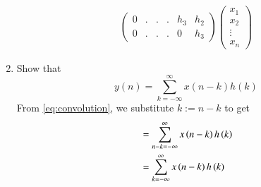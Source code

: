 \documentclass[journal,12pt,twocolumn]{IEEEtran}
\renewcommand\thesection{\arabic{section}}
\begin{document}
\begin{enumerate}[label=\thesection.\arabic*]
\begin{align}
\begin{pmatrix}
		0 & . & . & . & h_3 & h_2 \\
		0 & . & . & . & 0 & h_3
	\end{pmatrix}
	\begin{pmatrix}
		x_1 \\ x_2 \\ \vdots \\ x_n
	\end{pmatrix}
\end{align}
\item Show that
\begin{equation}
	y(n) =  \sum_{k=-\infty}^{\infty}x(n-k)h(k)
\end{equation}
\solution 
From \eqref{eq:convolution}, we substitute $k := n - k$ to get
\begin{align}
	&= \sum_{n - k=-\infty}^{\infty}x\left(n - k\right)h\left(k\right) \\
	&= \sum_{k=-\infty}^{\infty}x\left(n - k\right)h\left(k\right)
\end{align}
\end{enumerate}
\end{document}
